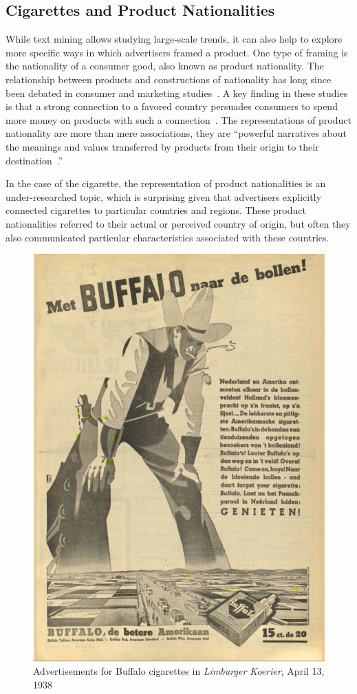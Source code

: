 \documentclass[USenglish]{article}
\begin{document}
\subsection{Cigarettes and Product Nationalities}
While text mining allows studying large-scale trends, it can also help to explore more specific ways in which advertisers framed a product. One type of framing is the nationality of a consumer good, also known as product nationality. The relationship between products and constructions of nationality has long since been debated in consumer and marketing studies~\cite{thakor_brand_1996, hull_cultural_2016}. A key finding in these studies is that a strong connection to a favored country persuades consumers to spend more money on products with such a connection~\cite{menapace_consumers_2011}. The representations of product nationality are more than mere associations, they are ``powerful narratives about the meanings and values transferred by products from their origin to their destination~\cite{askegaard_product-country_1998}.''

In the case of the cigarette, the representation of product nationalities is an under-researched topic, which is surprising given that advertisers explicitly connected cigarettes to particular countries and regions.  These product nationalities referred to their actual or perceived country of origin, but often they also communicated particular characteristics associated with these countries. 

\begin{figure}
  \centering
  \includegraphics[width=.5\textwidth]{figures/example_buffalo.jpg}
  \caption{Advertisements for Buffalo cigarettes in \textit{Limburger Koerier}, April 13, 1938}
  \label{fig:buffalo_example}
\end{figure}
\end{document}
